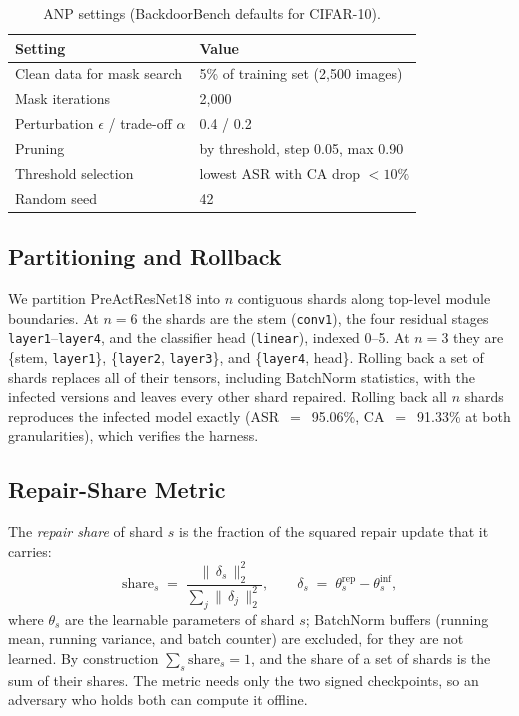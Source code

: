 \documentclass[conference,a4paper]{IEEEtran}  %
\begin{document}
\begin{table}[t]
\centering
\caption{ANP settings (BackdoorBench defaults for CIFAR-10).}
\label{tab:anp_config}
\begin{tabular}{ll}
\toprule
Setting & Value \\
\midrule
Clean data for mask search & 5\% of training set (2{,}500 images) \\
Mask iterations            & 2{,}000 \\
Perturbation $\epsilon$ / trade-off $\alpha$ & 0.4 / 0.2 \\
Pruning                    & by threshold, step 0.05, max 0.90 \\
Threshold selection        & lowest ASR with CA drop $<10\%$ \\
Random seed                & 42 \\
\bottomrule
\end{tabular}
\end{table}
\fi

\subsection{Partitioning and Rollback}
\label{sec:partition}

We partition PreActResNet18 into $n$ contiguous shards along
top-level module boundaries. At $n\!=\!6$ the shards are the stem
(\texttt{conv1}), the four residual stages \texttt{layer1}--\texttt{layer4},
and the classifier head (\texttt{linear}), indexed 0--5. At $n\!=\!3$ they
are \{stem, \texttt{layer1}\}, \{\texttt{layer2}, \texttt{layer3}\}, and
\{\texttt{layer4}, head\}. Rolling back a set of shards replaces all of
their tensors, including BatchNorm statistics, with the infected
versions and leaves every other shard repaired. Rolling back all $n$
shards reproduces the infected model exactly (ASR~$=$~95.06\%,
CA~$=$~91.33\% at both granularities), which verifies the harness.

\subsection{Repair-Share Metric}
\label{sec:share}

The \emph{repair share} of shard $s$ is the fraction of the squared
repair update that it carries:
\begin{equation}
  \mathrm{share}_s \;=\; \frac{\|\,\delta_s\,\|_2^2}{\sum_j \|\,\delta_j\,\|_2^2},
  \qquad
  \delta_s \;=\; \theta^{\mathrm{rep}}_s - \theta^{\mathrm{inf}}_s,
  \label{eq:share}
\end{equation}
where $\theta_s$ are the learnable parameters of shard $s$; BatchNorm buffers (running mean, running variance, and batch counter) are excluded, for they are not learned. By construction $\sum_s \mathrm{share}_s = 1$, and the share of
a set of shards is the sum of their shares. The metric needs only the two signed checkpoints, so an adversary who holds both can compute it offline.
\end{document}
